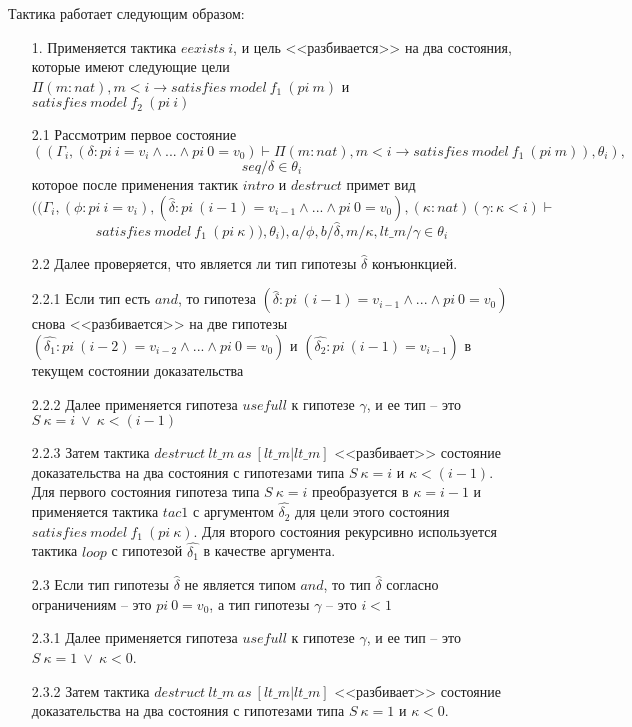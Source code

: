 \documentclass[12pt]{article}
\begin{document}
Тактика работает следующим образом:
\begin{enumerate}
\item[1.] Применяется тактика $eexists\ i$, и цель <<разбивается>> на два состояния, которые имеют следующие цели
$\Pi (m : nat), m < i \xrightarrow{} satisfies\ model\ f_1\ (pi\ m)$ и $satisfies\ model\ f_2\ (pi\ i)$
\item[2.1] Рассмотрим первое состояние $$((\Gamma_i, (\delta : pi\ i = v_i \wedge ... \wedge pi\ 0 = v_0) \vdash \Pi (m : nat), m < i \xrightarrow{} satisfies\ model\ f_1\ (pi\ m)), \theta_i),$$
$$ seq/\delta \in \theta_i$$ которое после применения тактик $intro$ и $destruct$ примет вид
$$((\Gamma_i, (\phi:pi\ i = v_i),(\hat{\delta} : pi\ (i-1) = v_{i-1} \wedge ... \wedge pi\ 0 = v_0), (\kappa : nat) (\gamma: \kappa < i) \vdash $$
$$satisfies\ model\ f_1\ (pi\ \kappa)), \theta_i), a/\phi,b/\hat{\delta}, m/\kappa, lt\_m/\gamma \in \theta_i$$
\item[2.2] Далее проверяется, что является ли тип гипотезы $\hat{\delta}$ конъюнкцией. 
\item[2.2.1] Если тип есть $and$, то гипотеза $(\hat{\delta} : pi\ (i-1) = v_{i-1} \wedge ... \wedge pi\ 0 = v_0)$ снова <<разбивается>> на две гипотезы $(\hat{\delta_1} : pi\ (i-2) = v_{i-2} \wedge ... \wedge pi\ 0 = v_0)$ и $(\hat{\delta_2} : pi\ (i-1) = v_{i-1})$ в текущем состоянии доказательства
\item[2.2.2] Далее применяется гипотеза $usefull$ к гипотезе $\gamma$, и ее тип -- это $ S\ \kappa = i\ \vee \ \kappa < (i - 1)$
\item[2.2.3] Затем тактика $destruct\ lt\_m\ as\ [lt\_m| lt\_m]$  <<разбивает>> состояние доказательства на два состояния с гипотезами типа $S\ \kappa = i$ и $\kappa < (i - 1)$. 
Для первого состояния гипотеза типа $S\ \kappa = i$ преобразуется в $\kappa = i - 1$ и применяется тактика $tac1$ с аргументом $\hat{\delta_2}$ для цели этого состояния $satisfies\ model\ f_1\ (pi\ \kappa)$.
Для второго состояния рекурсивно используется тактика $loop$ с гипотезой $\hat{\delta_1}$ в качестве аргумента.
\item[2.3] Если тип гипотезы $\hat{\delta}$ не является типом $and$, то тип $\hat{\delta}$ согласно ограничениям -- это $pi\ 0 = v_0$, а тип гипотезы $\gamma$ -- это $i<1$
\item[2.3.1] Далее применяется гипотеза $usefull$ к гипотезе $\gamma$, и ее тип -- это $ S\ \kappa = 1\ \vee \ \kappa < 0$.
\item[2.3.2] Затем тактика $destruct\ lt\_m\ as\ [lt\_m| lt\_m]$  <<разбивает>> состояние доказательства на два состояния с гипотезами типа $S\ \kappa = 1$ и $\kappa < 0$. 

\end{enumerate}
\end{document}
